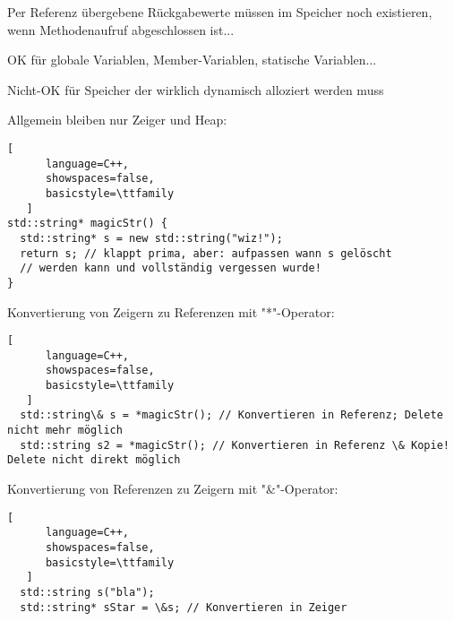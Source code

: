 \documentclass[10pt]{article}
\begin{document}
\begin{itemize*}
\begin{itemize*}
  \item Per Referenz übergebene Rückgabewerte müssen im Speicher noch existieren, wenn Methodenaufruf abgeschlossen ist...
  \begin{itemize*}
    \item OK für globale Variablen, Member-Variablen, statische Variablen...
    \item Nicht-OK für Speicher der wirklich dynamisch alloziert werden muss
  \end{itemize*}
  \item Allgemein bleiben nur Zeiger und Heap:
  \begin{lstlisting}[
      language=C++,
      showspaces=false,
      basicstyle=\ttfamily
   ]
std::string* magicStr() {
  std::string* s = new std::string("wiz!");
  return s; // klappt prima, aber: aufpassen wann s gelöscht
  // werden kann und vollständig vergessen wurde!
}
\end{lstlisting}
  
  
  \item Konvertierung von Zeigern zu Referenzen mit "*"-Operator:
  \begin{lstlisting}[
      language=C++,
      showspaces=false,
      basicstyle=\ttfamily
   ]
  std::string\& s = *magicStr(); // Konvertieren in Referenz; Delete nicht mehr möglich
  std::string s2 = *magicStr(); // Konvertieren in Referenz \& Kopie! Delete nicht direkt möglich
\end{lstlisting}
  
  \item Konvertierung von Referenzen zu Zeigern mit "\&"-Operator:
  \begin{lstlisting}[
      language=C++,
      showspaces=false,
      basicstyle=\ttfamily
   ]
  std::string s("bla");
  std::string* sStar = \&s; // Konvertieren in Zeiger
\end{lstlisting}
\end{itemize*}



\end{itemize*}
\end{document}
